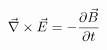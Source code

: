 \documentclass[preview]{standalone}
\begin{document}
\begin{align*}
\special{dvisvgm:raw <g id='unique000'>}\vec{\nabla} \times \vec{E} = -\frac{\partial \vec{B}}{\partial t}\special{dvisvgm:raw </g>}
\end{align*}
\end{document}
